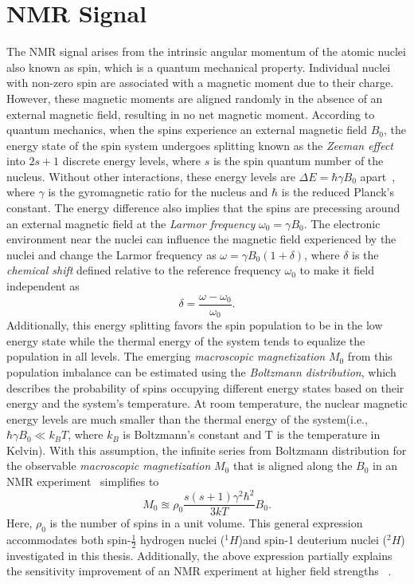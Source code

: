 \section{NMR Signal} \label{sec:nmr}
The \gls{NMR} signal arises from the intrinsic angular momentum of the atomic nuclei also known as spin, which is a quantum mechanical property. Individual nuclei with non-zero spin are associated with a magnetic moment due to their charge. However, these magnetic moments are aligned randomly  in the absence of an external magnetic field, resulting in no net magnetic moment. According to quantum mechanics, when the spins experience an external magnetic field $B_0$, the energy state of the spin system undergoes splitting known as the \emph{Zeeman effect} into $2s+1$ discrete energy levels, where $s$ is the spin quantum number of the nucleus. Without other interactions, these energy levels are $\Delta E=\hbar\gamma B_0$ apart~\cite{levittSpinDynamicsBasics}, where $\gamma$ is the gyromagnetic ratio for the nucleus and $\hbar$ is the reduced Planck's constant. The energy difference also implies that the spins are precessing around an external magnetic field at the \emph{Larmor frequency} $\omega_0= \gamma B_0$. The electronic environment near the nuclei can influence the magnetic field experienced by the nuclei and change the Larmor frequency as $\omega= \gamma B_0(1+\delta)$, where $\delta$ is the \emph{chemical shift} defined relative to the reference frequency $\omega_0$ to make it field independent as
\begin{equation}
	\label{eq:chemshift}
	\delta=\dfrac{\omega-\omega_0}{\omega_0}.
\end{equation}
Additionally, this energy splitting favors the spin population to be in the low energy state while the thermal energy of the system tends to equalize the population in all levels. The emerging \emph{macroscopic magnetization} $M_0$ from this population imbalance can be estimated using the \emph{Boltzmann distribution}, which describes the probability of spins occupying different energy states based on their energy and the system's temperature. At room temperature, the nuclear magnetic energy levels are much smaller than the thermal energy of the system(i.e., $\hbar\gamma B_0 \ll k_BT$, where $k_B$ is Boltzmann's constant and T is the temperature in Kelvin). With this assumption, the infinite series from Boltzmann distribution for the observable \emph{macroscopic magnetization} $M_0$ that is aligned along the $B_0$ in an \gls{NMR} experiment~\cite{haackeMagneticResonanceImaging1999} simplifies to 
\begin{equation}
	M_0 \approxeq \rho_0 \dfrac{s(s+1)\gamma^2\hbar^2}{3kT}B_0 .
	\label{eq:M0}
\end{equation}
Here, $\rho_0$ is the number of spins in a unit volume. This general expression accommodates both spin-$\tfrac{1}{2}$ hydrogen nuclei ($^1H$)and spin-1 deuterium nuclei ($^2H$) investigated in this thesis. Additionally, the above expression partially explains the sensitivity improvement of an \gls{NMR} experiment at higher field strengths ~\cite{pohmannSignaltonoiseRatioMR2016}.

